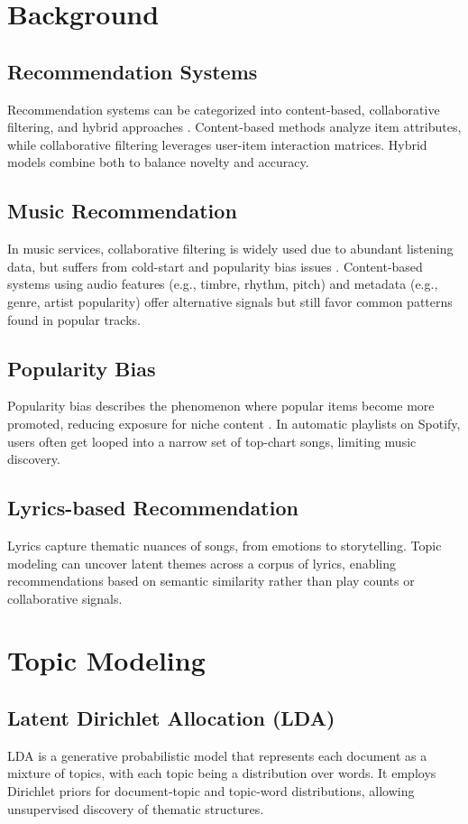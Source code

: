\documentclass[12pt]{article}
\begin{document}
\section{Background}
\subsection{Recommendation Systems}
Recommendation systems can be categorized into content-based, collaborative
filtering, and hybrid approaches \cite{adomavicius2005toward}. Content-based
methods analyze item attributes, while collaborative filtering leverages
user-item interaction matrices. Hybrid models combine both to balance novelty
and accuracy.

\subsection{Music Recommendation}
In music services, collaborative filtering is widely used due to abundant
listening data, but suffers from cold-start and popularity bias issues
\cite{celma2010music, abdollahpouri2019unfairness}. Content-based systems using
audio features (e.g., timbre, rhythm, pitch) and metadata (e.g., genre, artist
popularity) offer alternative signals but still favor common patterns found in
popular tracks.

\subsection{Popularity Bias}
Popularity bias describes the phenomenon where popular items become more
promoted, reducing exposure for niche content \cite{chen2020investigating}. In
automatic playlists on Spotify, users often get looped into a narrow set of
top-chart songs, limiting music discovery.

\subsection{Lyrics-based Recommendation}
Lyrics capture thematic nuances of songs, from emotions to storytelling. Topic
modeling can uncover latent themes across a corpus of lyrics, enabling
recommendations based on semantic similarity rather than play counts or
collaborative signals.

\section{Topic Modeling}
\subsection{Latent Dirichlet Allocation (LDA)}
LDA \cite{blei2003latent} is a generative probabilistic model that represents
each document as a mixture of topics, with each topic being a distribution over
words. It employs Dirichlet priors for document-topic and topic-word
distributions, allowing unsupervised discovery of thematic structures.
\end{document}
